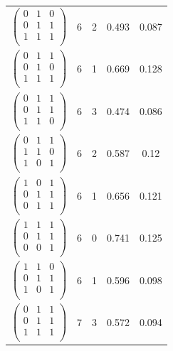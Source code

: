 \documentclass{amsart}
\theoremstyle{definition}
\theoremstyle{remark}
\numberwithin{equation}{section}
\begin{document}
\begin{longtable}{ c || c | c | c | c }
$\begin{pmatrix}
0 & 1 & 0\\
0 & 1 & 1\\
1 & 1 & 1\\
\end{pmatrix}$ & 6 & 2 & 0.493 & 0.087\\
$\begin{pmatrix}
0 & 1 & 1\\
0 & 1 & 0\\
1 & 1 & 1\\
\end{pmatrix}$ & 6 & 1 & 0.669 & 0.128\\
$\begin{pmatrix}
0 & 1 & 1\\
0 & 1 & 1\\
1 & 1 & 0\\
\end{pmatrix}$ & 6 & 3 & 0.474 & 0.086\\
$\begin{pmatrix}
0 & 1 & 1\\
1 & 1 & 0\\
1 & 0 & 1\\
\end{pmatrix}$ & 6 & 2 & 0.587 & 0.12\\
$\begin{pmatrix}
1 & 0 & 1\\
0 & 1 & 1\\
0 & 1 & 1\\
\end{pmatrix}$ & 6 & 1 & 0.656 & 0.121\\
$\begin{pmatrix}
1 & 1 & 1\\
0 & 1 & 1\\
0 & 0 & 1\\
\end{pmatrix}$ & 6 & 0 & 0.741 & 0.125\\
$\begin{pmatrix}
1 & 1 & 0\\
0 & 1 & 1\\
1 & 0 & 1\\
\end{pmatrix}$ & 6 & 1 & 0.596 & 0.098\\
$\begin{pmatrix}
0 & 1 & 1\\
0 & 1 & 1\\
1 & 1 & 1\\
\end{pmatrix}$ & 7 & 3 & 0.572 & 0.094\\

\end{longtable}
\end{document}
